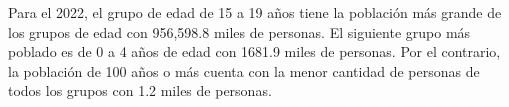 Para el 2022, el grupo de edad de 15 a 19 años tiene la población más grande de los grupos de edad con 956,598.8 miles de personas. El siguiente grupo más poblado es de 0 a 4 años de edad con 1681.9 miles de personas. Por el contrario,  la población de 100 años o más cuenta con la menor cantidad de personas de todos los grupos con 1.2 miles de personas. 